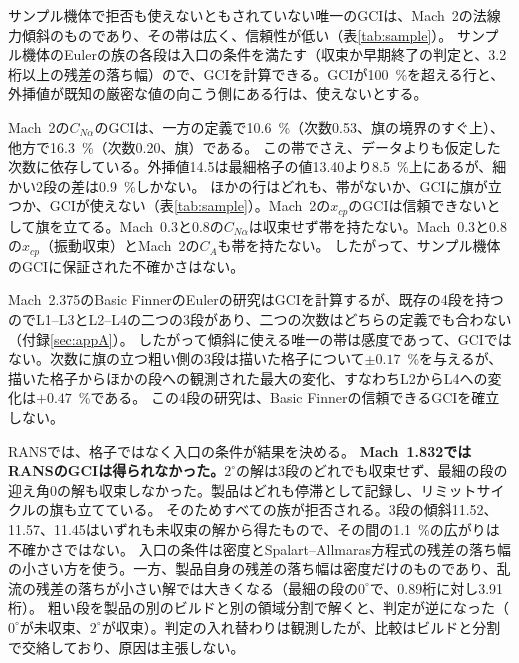 \documentclass[twocolumn]{labreport}
\newcommand{\CNa}{C_{N\alpha}}
\begin{document}
サンプル機体で拒否も使えないともされていない唯一のGCIは、Mach~2の法線力傾斜のものであり、その帯は広く、信頼性が低い（表\ref{tab:sample}）。
サンプル機体のEulerの族の各段は入口の条件を満たす（収束か早期終了の判定と、3.2桁以上の残差の落ち幅）ので、GCIを計算できる。GCIが100~\%を超える行と、外挿値が既知の厳密な値の向こう側にある行は、使えないとする。

Mach~2の$\CNa$のGCIは、一方の定義で10.6~\%（次数0.53、旗の境界のすぐ上）、他方で16.3~\%（次数0.20、旗）である。
この帯でさえ、データよりも仮定した次数に依存している。外挿値14.5は最細格子の値13.40より8.5~\%上にあるが、細かい2段の差は0.9~\%しかない。
ほかの行はどれも、帯がないか、GCIに旗が立つか、GCIが使えない（表\ref{tab:sample}）。Mach~2の$x_{cp}$のGCIは信頼できないとして旗を立てる。Mach~0.3と0.8の$\CNa$は収束せず帯を持たない。Mach~0.3と0.8の$x_{cp}$（振動収束）とMach~2の$C_A$も帯を持たない。
したがって、サンプル機体のGCIに保証された不確かさはない。

Mach~2.375のBasic FinnerのEulerの研究はGCIを計算するが、既存の4段を持つのでL1--L3とL2--L4の二つの3段があり、二つの次数はどちらの定義でも合わない（付録\ref{sec:appA}）。
したがって傾斜に使える唯一の帯は感度であって、GCIではない。次数に旗の立つ粗い側の3段は描いた格子について$\pm0.17$~\%を与えるが、描いた格子からほかの段への観測された最大の変化、すなわちL2からL4への変化は$+0.47$~\%である。
この4段の研究は、Basic Finnerの信頼できるGCIを確立しない。

RANSでは、格子ではなく入口の条件が結果を決める。
\textbf{Mach~1.832ではRANSのGCIは得られなかった。}$2^\circ$の解は3段のどれでも収束せず、最細の段の迎え角0の解も収束しなかった。製品はどれも停滞として記録し、リミットサイクルの旗も立てている。
そのためすべての族が拒否される。3段の傾斜11.52、11.57、11.45はいずれも未収束の解から得たもので、その間の1.1~\%の広がりは不確かさではない。
入口の条件は密度とSpalart--Allmaras方程式の残差の落ち幅の小さい方を使う。一方、製品自身の残差の落ち幅は密度だけのものであり、乱流の残差の落ちが小さい解では大きくなる（最細の段の$0^\circ$で、0.89桁に対し3.91桁）。
粗い段を製品の別のビルドと別の領域分割で解くと、判定が逆になった（$0^\circ$が未収束、$2^\circ$が収束）。判定の入れ替わりは観測したが、比較はビルドと分割で交絡しており、原因は主張しない。
\end{document}
